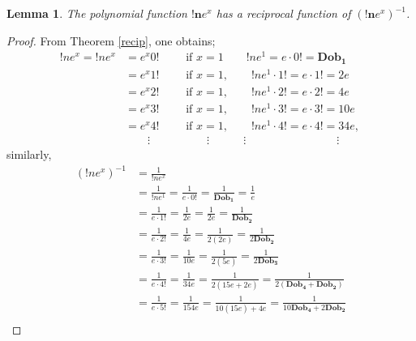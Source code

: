 \documentclass[pdflatex,sn-mathphys-num]{sn-jnl}%
\newtheorem{lemma}{Lemma}
\theoremstyle{thmstyleone}%
\theoremstyle{thmstyletwo}%
\theoremstyle{thmstylethree}%
\begin{document}

\begin{lemma}
    The polynomial function $\mathbf{!n}e^x$ has a reciprocal function of $(\mathbf{!n} e^x)^{-1}$.
\end{lemma}
\begin{proof} From Theorem \ref{recip}, one obtains;
   \begin{align*}
!ne^x = !ne^x &= e^x0!\quad \quad \mbox{ if } x=1 \quad\quad !n e^1 = e\cdotp0! =\mathbf{Dob_1}\\
&=e^x1!\quad \quad \mbox{ if } x=1, \quad\quad !n e^1\cdotp1! = e\cdotp1! =2e\\
&=e^x2!\quad \quad \mbox{ if } x=1, \quad\quad !n e^1\cdotp 2! = e\cdotp 2! =4e\\
&=e^x3! \quad \quad \mbox{ if } x=1, \quad\quad !n e^1\cdotp 3! = e\cdotp 3! =10e\\
&=e^x4!\quad \quad \mbox{ if } x=1, \quad\quad !n e^1\cdotp 4! = e\cdotp 4! =34e,\\
&\quad \quad \vdots\quad \quad \quad \quad \quad \vdots \quad \quad \quad\vdots \quad \quad \quad \quad \quad \quad \quad  \quad\vdots \quad \quad
\end{align*}
similarly,
\begin{align*}
(!n e^x)^{-1} &= \frac{1}{!ne^x} \\
& = \frac{1}{!ne^1}= \frac{1}{e\cdotp 0!} = \frac{1}{\mathbf{Dob_1}} = \frac{1}{e} \\
&=\frac{1}{e\cdotp 1!} =\frac{1}{2e} =\frac{1}{2e}=\frac{1}{\mathbf{Dob_2}}\\
&= \frac{1}{e\cdotp 2!} =\frac{1}{4e}=\frac{1}{2(2e)}=\frac{1}{2\mathbf{Dob_2}}\\
& = \frac{1}{e\cdotp 3!} =\frac{1}{10e}=\frac{1}{2(5e)}=\frac{1}{2\mathbf{Dob_3}}\\
& = \frac{1}{e\cdotp 4!} =\frac{1}{34e}=\frac{1}{2(15e+2e)}=\frac{1}{2(\mathbf{Dob_4}+ \mathbf{Dob_2})}\\
& = \frac{1}{e\cdotp 5!} =\frac{1}{154e}=\frac{1}{10(15e) + 4e}=\frac{1}{10\mathbf{Dob_4} + 2\mathbf{Dob_2}}\\

\end{align*}
\end{proof}
\end{document}
